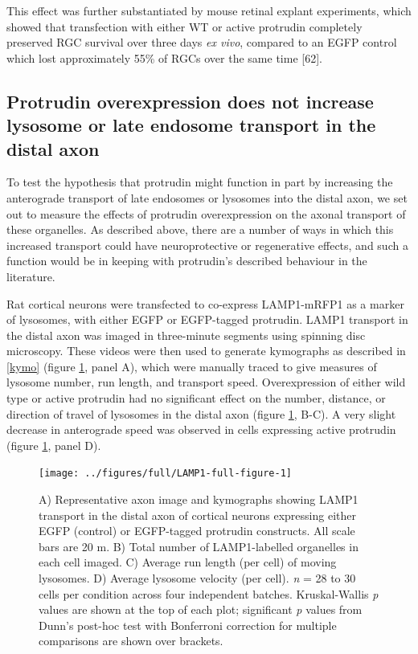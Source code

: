 \documentclass[
  12pt,
  a4paper,
]{book}
\begin{document}
This effect was further substantiated by mouse retinal explant experiments, which showed that transfection with either WT or active protrudin completely preserved RGC survival over three days \emph{ex vivo}, compared to an EGFP control which lost approximately 55\% of RGCs over the same time {[}62{]}.

\hypertarget{lyso-LE}{%
\subsection{Protrudin overexpression does not increase lysosome or late endosome transport in the distal axon}\label{lyso-LE}}

To test the hypothesis that protrudin might function in part by increasing the anterograde transport of late endosomes or lysosomes into the distal axon, we set out to measure the effects of protrudin overexpression on the axonal transport of these organelles. As described above, there are a number of ways in which this increased transport could have neuroprotective or regenerative effects, and such a function would be in keeping with protrudin's described behaviour in the literature.

Rat cortical neurons were transfected to co-express LAMP1-mRFP1 as a marker of lysosomes, with either EGFP or EGFP-tagged protrudin. LAMP1 transport in the distal axon was imaged in three-minute segments using spinning disc microscopy. These videos were then used to generate kymographs as described in \ref{kymo} (figure \ref{fig:LAMP1-full-figure}, panel A), which were manually traced to give measures of lysosome number, run length, and transport speed. Overexpression of either wild type or active protrudin had no significant effect on the number, distance, or direction of travel of lysosomes in the distal axon (figure \ref{fig:LAMP1-full-figure}, B-C). A very slight decrease in anterograde speed was observed in cells expressing active protrudin (figure \ref{fig:LAMP1-full-figure}, panel D).



\begin{figure}
\texttt{[image: ../figures/full/LAMP1-full-figure-1]} \caption[Protrudin effect on lysosome (LAMP1) transport in the distal axon]{A) Representative axon image and kymographs showing LAMP1 transport in the distal axon of cortical neurons expressing either EGFP (control) or EGFP-tagged protrudin constructs. All scale bars are 20 \textmu{}m. B) Total number of LAMP1-labelled organelles in each cell imaged. C) Average run length (per cell) of moving lysosomes. D) Average lysosome velocity (per cell). \emph{n} = 28 to 30 cells per condition across four independent batches. Kruskal-Wallis \emph{p} values are shown at the top of each plot; significant \emph{p} values from Dunn's post-hoc test with Bonferroni correction for multiple comparisons are shown over brackets.}\label{fig:LAMP1-full-figure}
\end{figure}
\end{document}

